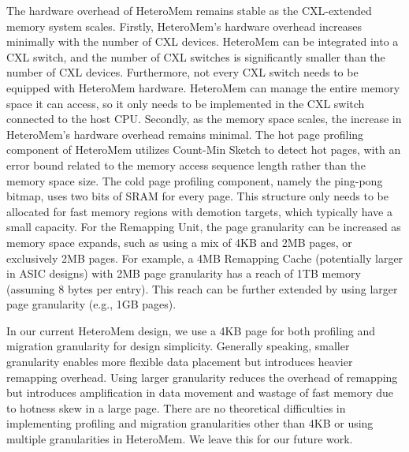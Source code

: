 The hardware overhead of HeteroMem remains stable as the CXL-extended memory system scales. Firstly, HeteroMem's hardware overhead increases minimally with the number of CXL devices. HeteroMem can be integrated into a CXL switch, and the number of CXL switches is significantly smaller than the number of CXL devices. Furthermore, not every CXL switch needs to be equipped with HeteroMem hardware. HeteroMem can manage the entire memory space it can access, so it only needs to be implemented in the CXL switch connected to the host CPU.
Secondly, as the memory space scales, the increase in HeteroMem's hardware overhead remains minimal. The hot page profiling component of HeteroMem utilizes Count-Min Sketch to detect hot pages, with an error bound related to the memory access sequence length rather than the memory space size. The cold page profiling component, namely the ping-pong bitmap, uses two bits of SRAM for every page. This structure only needs to be allocated for fast memory regions with demotion targets, which typically have a small capacity.
For the Remapping Unit, the page granularity can be increased as memory space expands, such as using a mix of 4KB and 2MB pages, or exclusively 2MB pages. For example, a 4MB Remapping Cache (potentially larger in ASIC designs) with 2MB page granularity has a reach of 1TB memory (assuming 8 bytes per entry). This reach can be further extended by using larger page granularity (e.g., 1GB pages).




In our current HeteroMem design, we use a 4KB page for both profiling and migration granularity for design simplicity. Generally speaking, smaller granularity enables more flexible data placement but introduces heavier remapping overhead. Using larger granularity reduces the overhead of remapping but introduces amplification in data movement and wastage of fast memory due to hotness skew in a large page.
There are no theoretical difficulties in implementing profiling and migration granularities other than 4KB or using multiple granularities in HeteroMem. We leave this for our future work.

